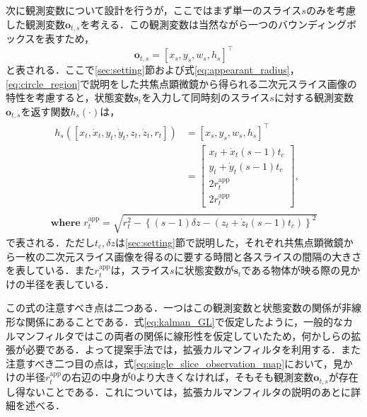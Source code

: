     次に観測変数について設計を行うが，ここではまず単一のスライス$s$のみを考慮した観測変数$\bm{o}_{t, s}$を考える．この観測変数は当然ながら一つのバウンディングボックスを表すため，
    \begin{equation}
        \label{eq:single_slice_observation}
        \bm{o}_{t, s} = \left[x_s, y_s, w_s, h_s\right]^{\top}
    \end{equation}
    と表される．ここで\ref{sec:setting}節および式\ref{eq:appearant_radius}，\ref{eq:circle_region}で説明をした共焦点顕微鏡から得られる二次元スライス画像の特性を考慮すると，状態変数$\bm{s}_t$を入力して同時刻のスライス$s$に対する観測変数$\bm{o}_{t,s}$を返す関数$h_s(\cdot)$は，
    \begin{equation}
        \label{eq:single_slice_observation_map}
        \begin{gathered}
            \begin{aligned}
                h_s(\left[x_t, \dot{x}_t, y_t, \dot{y}_t, z_t, \dot{z}_t, r_t\right]) &= \left[x_s, y_s, w_s, h_s\right]^{\top}
                \\ &= 
                \begin{bmatrix}
                    x_t + \dot{x}_t (s - 1) t_c
                    \\ y_t + \dot{y}_t (s - 1) t_c
                    \\ 2r_t^{\text{app}}
                    \\ 2r_t^{\text{app}}
                \end{bmatrix},                
            \end{aligned}
            \\ \textbf{where } r_t^{\text{app}} = \sqrt{r_t^2 - \left\{(s - 1)\delta z - \left(z_t + \dot{z}_t (s - 1) t_c\right) \right\}^2}
        \end{gathered}
    \end{equation}
    で表される．ただし$t_c, \delta z$は\ref{sec:setting}節で説明した，それぞれ共焦点顕微鏡から一枚の二次元スライス画像を得るのに要する時間と各スライスの間隔の大きさを表している．また$r_t^{\text{app}}$は，スライス$s$に状態変数が$\bm{s}_t$である物体が映る際の見かけの半径を表している．

    この式の注意すべき点は二つある．一つはこの観測変数と状態変数の関係が非線形な関係にあることである．式\ref{eq:kalman_GL}で仮定したように，一般的なカルマンフィルタではこの両者の関係に線形性を仮定していたため，何かしらの拡張が必要である．よって提案手法では，拡張カルマンフィルタ\cite{bishop2001introduction}を利用する．また注意すべき二つ目の点は，式\ref{eq:single_slice_observation_map}において，見かけの半径$r_t^{\text{app}}$の右辺の中身が$0$より大きくなければ，そもそも観測変数$\bm{o}_{t,s}$が存在し得ないことである．これについては，拡張カルマンフィルタの説明のあとに詳細を述べる．

